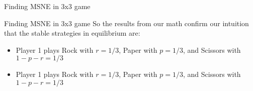 \begin{frame}{Finding MSNE in 3x3 game}
  \begin{minipage}{0.45\textwidth}
  \begin{center}
  \end{center}
  \end{minipage} 
  \begin{minipage}{0.45\textwidth}
  \begin{center}
  \end{center}
  \end{minipage} 
\end{frame}

\begin{frame}{Finding MSNE in 3x3 game}
  So the results from our math confirm our intuition that the stable strategies in equilibrium are:
  \begin{itemize}
    \item Player 1 plays Rock with $r=1/3$, Paper with $p=1/3$, and Scissors with $1-p-r=1/3$
    \item Player 1 plays Rock with $r=1/3$, Paper with $p=1/3$, and Scissors with $1-p-r=1/3$
  \end{itemize}
\end{frame}
